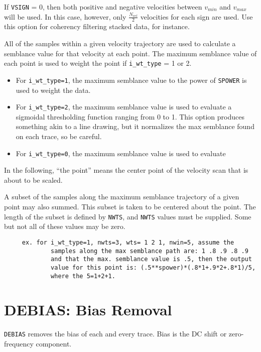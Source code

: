      If \texttt{VSIGN} = 0, then both positive and negative velocities between
     $v_{min}$ and $v_{max}$ will be used.  In this case, however, only $\frac{N_{vel}}{2}$
     velocities for each sign are used. Use this option for coherency
     filtering stacked data, for instance.

     All of the samples within a given velocity trajectory are used to
     calculate a semblance value for that velocity at each point.
     The maximum semblance value of each point is used to weight the
     point if \texttt{i\_wt\_type} = 1 or 2.
\begin{itemize}
    \item For \texttt{i\_wt\_type=1}, the maximum semblance value to the power
        of \texttt{SPOWER} is used to weight the data.
    \item For \texttt{i\_wt\_type=2}, the maximum semblance value is used to
        evaluate a sigmoidal thresholding function ranging from 0 to 1.  This
        option produces something akin to a line drawing, but it normalizes the
        max semblance found on each trace, so be careful.
    \item For \texttt{i\_wt\_type=0}, the maximum semblance value is used to
        evaluate
\end{itemize}

     In the following, ``the point'' means the center point of the velocity
     scan that is about to be scaled.

     A subset of the samples along the maximum semblance trajectory
     of a given point may also summed.  This subset
     is taken to be centered about the point.  The length of the subset
     is defined by \texttt{NWTS}, and \texttt{NWTS} values must be supplied.  Some but not
     all of these values may be zero.

\begin{verbatim}
     ex. for i_wt_type=1, nwts=3, wts= 1 2 1, nwin=5, assume the
             samples along the max semblance path are: 1 .8 .9 .8 .9
             and that the max. semblance value is .5, then the output
             value for this point is: (.5**spower)*(.8*1+.9*2+.8*1)/5,
             where the 5=1+2+1.
\end{verbatim}

\section{DEBIAS: Bias Removal}
\label{cmd_debias}

\texttt{DEBIAS} removes the bias of each and every trace.  Bias is the DC shift
or zero-frequency component.

